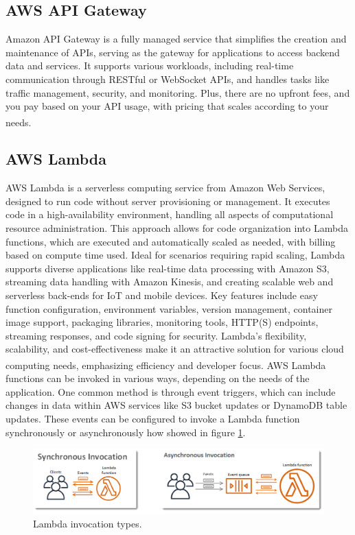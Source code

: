 \subsection{AWS API Gateway}
Amazon API Gateway is a fully managed service that simplifies the creation and maintenance of APIs,
serving as the gateway for applications to access backend data and services. It supports various
workloads, including real-time communication through RESTful or WebSocket APIs, and handles tasks
like traffic management, security, and monitoring. Plus, there are no upfront fees, and you pay
based on your API usage, with pricing that scales according to your
needs\textsuperscript{\cite{tech_2}}.

\subsection{AWS Lambda}
AWS Lambda is a serverless computing service from Amazon Web Services, designed to run code without
server provisioning or management. It executes code in a high-availability environment, handling all
aspects of computational resource administration. This approach allows for code organization into
Lambda functions, which are executed and automatically scaled as needed, with billing based on
compute time used. Ideal for scenarios requiring rapid scaling, Lambda supports diverse applications
like real-time data processing with Amazon S3, streaming data handling with Amazon Kinesis, and
creating scalable web and serverless back-ends for IoT and mobile devices. Key features include easy
function configuration, environment variables, version management, container image support,
packaging libraries, monitoring tools, HTTP(S) endpoints, streaming responses, and code signing for
security. Lambda's flexibility, scalability, and cost-effectiveness make it an attractive solution
for various cloud computing needs, emphasizing efficiency and developer
focus\textsuperscript{\cite{tech_3}}.
\newline\newline
AWS Lambda functions can be invoked in various ways, depending on the needs of the application. One
common method is through event triggers, which can include changes in data within AWS services like
S3 bucket updates or DynamoDB table updates. These events can be configured to invoke a Lambda
function synchronously or asynchronously how showed in figure \ref{fig:3_lambda_invocation}.

\begin{figure}
    \centering
    \includegraphics[scale=0.5]{Pictures/3_lambda.png}
    \caption{Lambda invocation types.}
    \label{fig:3_lambda_invocation}
\end{figure}

